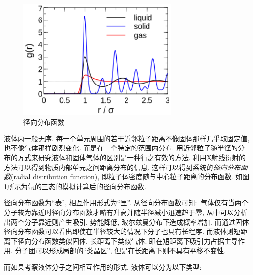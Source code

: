 \begin{figure}
\vspace{-0.4cm}
\centering
\includegraphics[width=8cm]{image/5-3-8.png}
\caption{径向分布函数}\label{fig:rdf}
\end{figure}
液体内一般无序. 每一个单元周围的若干近邻粒子距离不像固体那样几乎取固定值, 也不像气体那样剧烈变化. 而是在一个特定的范围内分布. 用近邻粒子随半径的分布的方式来研究液体和固体气体的区别是一种行之有效的方法. 利用X射线衍射的方法可以得到物质内部单元之间距离分布的信息. 这样可以得到系统的\emph{径向分布函数}(radial distribution function), 即粒子体密度随与中心粒子距离的分布函数. 如图\ref{fig:rdf}所示为氩的三态的模拟计算后的径向分布函数.

径向分布函数为``表'', 相互作用形式为``里''. 从径向分布函数可知:\, 气体仅有当两个分子较为靠近时径向分布函数才略有升高并随半径减小迅速趋于零, 从中可以分析出两个分子靠近则产生吸引, 势能降低, 玻尔兹曼分布下造成概率增加. 而通过固体径向分布函数可以看出即使在半径较大的情况下分子也具有长程序. 而液体则短距离下径向分布函数类似固体, 长距离下类似气体. 即在短距离下吸引力占据主导作用, 分子团可以形成局部的``类晶区'', 但是在长距离下则不具有平移不变性.

而如果考察液体分子之间相互作用的形式. 液体可以分为以下类型:

